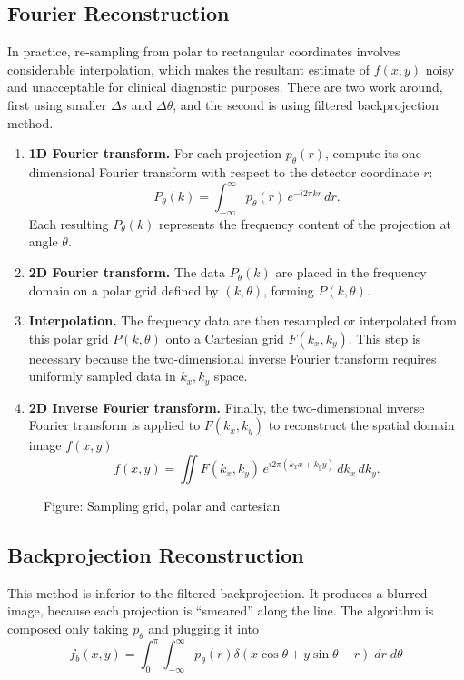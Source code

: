 \documentclass[../../../main.tex]{subfiles}
\begin{document}
\subsection{Fourier Reconstruction}
In practice, re-sampling from polar to rectangular coordinates involves considerable interpolation, which makes the resultant estimate of $f(x,y)$ noisy and unacceptable for clinical diagnostic purposes. 
There are two work around, first using smaller $\Delta s$ and $\Delta \theta$, and the second is using filtered backprojection method.

\begin{enumerate}
    \item \textbf{1D Fourier transform.} For each projection \( p_\theta(r) \), compute its one-dimensional Fourier transform with respect to the detector coordinate \( r \):
    \[
    P_\theta(k) = \int_{-\infty}^{\infty} p_\theta(r)\, e^{-i 2 \pi k r}\, dr.
    \]
    Each resulting \( P_\theta(k) \) represents the frequency content of the projection at angle \( \theta \).

    \item \textbf{2D Fourier transform.} The data \( P_\theta(k) \) are placed in the frequency domain on a polar grid defined by \( (k, \theta) \), forming \( P(k,\theta) \).

    \item \textbf{Interpolation.} The frequency data are then resampled or interpolated from this polar grid \( P(k,\theta) \) onto a Cartesian grid \( F(k_x, k_y) \). This step is necessary because the two-dimensional inverse Fourier transform requires uniformly sampled data in \( k_x, k_y \) space.

    \item \textbf{2D Inverse Fourier transform.} Finally, the two-dimensional inverse Fourier transform is applied to \( F(k_x, k_y) \) to reconstruct the spatial domain image \( f(x,y) \)
    \[
    f(x,y) = \iint F(k_x, k_y)\, e^{i 2 \pi (k_x x + k_y y)}\, dk_x\, dk_y.
    \]
\end{enumerate}
\begin{figure*}
    \centering
    \caption*{Figure: Sampling grid, polar and cartesian}
\end{figure*}

\subsection{Backprojection Reconstruction}
This method is inferior to the filtered backprojection.
It produces a blurred image, because each projection is “smeared” along the line.
The algorithm is composed only taking $p_\theta$ and plugging it into 
\begin{equation*}
       f_b(x,y)=\int_{0 }^{\pi}\int_{-\infty}^{\infty} p_\theta(r)\delta(x\cos\theta+y\sin\theta -r)\;dr\;d\theta 
\end{equation*}
\end{document}
